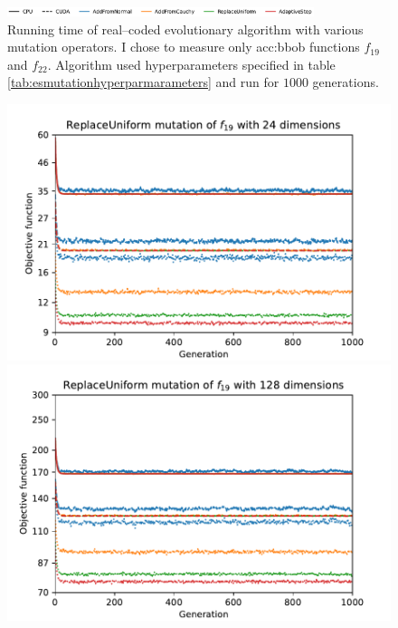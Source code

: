 \begin{figure}[ht!]
    \begin{minipage}{\textwidth}
        \centering
        \includegraphics[width=0.8\textwidth]{img/runs/time_es_mutation_legend.pdf}
    \end{minipage}

    \caption[Running time of mutation operators]{Running time of real--coded evolutionary algorithm with various mutation operators. I chose to measure only \acrshort{acc:bbob} functions $f_{19}$ and $f_{22}$. Algorithm used hyperparameters specified in table \ref{tab:esmutationhyperparmarameters} and run for $1000$ generations.}
\end{figure}



\begin{figure}[ht!]
    \begin{minipage}[t]{0.32\textwidth}
        \centering
        \includegraphics[width=\textwidth]{img/runs/fitness_es_mutation_f19_dim24_ReplaceUniform.pdf}
    \end{minipage}
    \hfill
    \begin{minipage}[t]{0.32\textwidth}
        \centering
        \includegraphics[width=\textwidth]{img/runs/fitness_es_mutation_f19_dim128_ReplaceUniform.pdf}

\end{minipage}
\end{figure}
